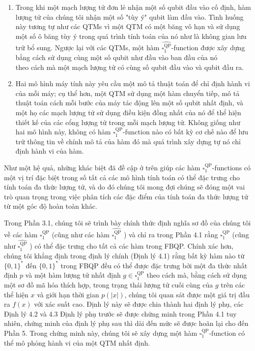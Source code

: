 \documentclass[10pt]{article}
\begin{document}
\begin{enumerate}
  \item Trong khi một mạch lượng tử đơn lẻ nhận một số qubit đầu vào cố định, hàm lượng tử của chúng tôi nhận một số "tùy ý" qubit làm đầu vào. Tình huống này tương tự như các QTMs vì một QTM có một băng vô hạn và sử dụng một số ô băng tùy ý trong quá trình tính toán của nó như là không gian lưu trữ bổ sung. Ngược lại với các QTMs, một hàm $\widehat{\square_{1}^{\mathrm{QP}}}$-function được xây dựng bằng cách sử dụng cùng một số qubit như đầu vào ban đầu của nó\\
theo cách mà một mạch lượng tử có cùng số qubit đầu vào và qubit đầu ra.
  \item Hai mô hình máy tính này yêu cầu một mô tả thuật toán để chỉ định hành vi của mỗi máy; cụ thể hơn, một QTM sử dụng một hàm chuyển tiếp, mô tả thuật toán cách mỗi bước của máy tác động lên một số qubit nhất định, và một họ các mạch lượng tử sử dụng điều kiện đồng nhất của nó để thể hiện thiết kế của các cổng lượng tử trong mỗi mạch lượng tử. Không giống như hai mô hình này, không có hàm $\square_{1}^{\mathrm{QP}}$-function nào có bất kỳ cơ chế nào để lưu trữ thông tin về chính mô tả của hàm đó mà quá trình xây dựng tự nó chỉ định hành vi của hàm.
\end{enumerate}

Như một hệ quả, những khác biệt đã đề cập ở trên giúp các hàm $\square_{1}^{\mathrm{QP}}$-functions có một vị trí đặc biệt trong số tất cả các mô hình tính toán có thể đặc trưng cho tính toán đa thức lượng tử, và do đó chúng tôi mong đợi chúng sẽ đóng một vai trò quan trọng trong việc phân tích các đặc điểm của tính toán đa thức lượng tử từ một góc độ hoàn toàn khác.

Trong Phần 3.1, chúng tôi sẽ trình bày chính thức định nghĩa sơ đồ của chúng tôi về các hàm $\square_{1}^{\mathrm{QP}}$ (cũng như các hàm $\widehat{\square_{1}^{\mathrm{QP}}}$ ) và chỉ ra trong Phần 4.1 rằng $\square_{1}^{\mathrm{QP}}$ (cũng như $\widehat{\square_{1}^{\mathrm{QP}}}$ ) có thể đặc trưng cho tất cả các hàm trong FBQP. Chính xác hơn, chúng tôi khẳng định trong định lý chính (Định lý 4.1) rằng bất kỳ hàm nào từ $\{0,1\}^{*}$ đến $\{0,1\}^{*}$ trong FBQP đều có thể được đặc trưng bởi một đa thức nhất định $p$ và một hàm lượng tử nhất định $g \in \square_{1}^{\mathrm{QP}}$ theo cách mà, bằng cách sử dụng một sơ đồ mã hóa thích hợp, trong trạng thái lượng tử cuối cùng của $g$ trên các thể hiện $x$ và giới hạn thời gian $p(|x|)$, chúng tôi quan sát được một giá trị đầu ra $f(x)$ với xác suất cao. Định lý này sẽ được chia thành hai định lý phụ, các Định lý 4.2 và 4.3 Định lý phụ trước sẽ được chứng minh trong Phần 4.1 tuy nhiên, chứng minh của định lý phụ sau thì dài đến mức sẽ được hoãn lại cho đến Phần 5. Trong chứng minh này, chúng tôi sẽ xây dựng một hàm $\square_{1}^{\mathrm{QP}}$-function có thể mô phỏng hành vi của một QTM nhất định.
\end{document}
